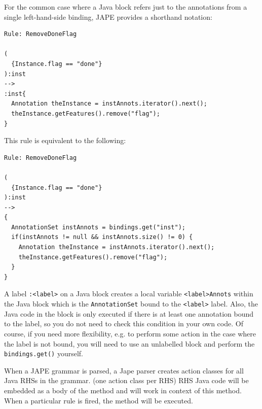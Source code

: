 
For the common case where a Java block refers just to the annotations from a
single left-hand-side binding, JAPE provides a shorthand notation:
%
\begin{small}
\begin{verbatim}
Rule: RemoveDoneFlag

(
  {Instance.flag == "done"}
):inst
-->
:inst{
  Annotation theInstance = instAnnots.iterator().next();
  theInstance.getFeatures().remove("flag");
}
\end{verbatim}
\end{small}

This rule is equivalent to the following:
%
\begin{small}
\begin{verbatim}
Rule: RemoveDoneFlag

(
  {Instance.flag == "done"}
):inst
-->
{
  AnnotationSet instAnnots = bindings.get("inst");
  if(instAnnots != null && instAnnots.size() != 0) {
    Annotation theInstance = instAnnots.iterator().next();
    theInstance.getFeatures().remove("flag");
  }
}
\end{verbatim}
\end{small}

A label \verb|:<label>| on a Java block creates a local variable
\verb|<label>Annots| within the Java block which is the \verb|AnnotationSet|
bound to the \verb|<label>| label.  Also, the Java code in the block is only
executed if there is at least one annotation bound to the label, so you do not
need to check this condition in your own code.  Of course, if you need more
flexibility, e.g. to perform some action in the case where the label is not
bound, you will need to use an unlabelled block and perform the
\verb|bindings.get()| yourself.


When a JAPE grammar is parsed, a Jape parser creates action classes for all Java RHSs in the grammar.
(one action class per RHS) RHS Java code will be embedded as a body of the method 
\verb@doit@ and will work in context of this method. When a particular rule is fired,
the method \verb@doit@ will be executed.


